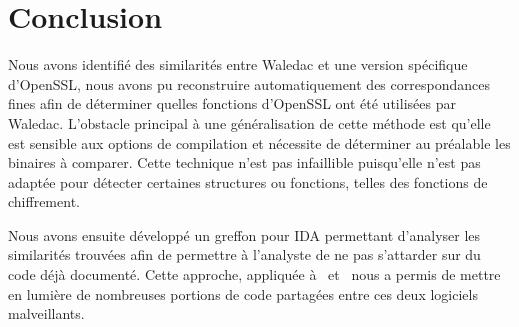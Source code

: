 \section{Conclusion}
Nous avons identifié des similarités entre Waledac et une version spécifique d'OpenSSL, nous avons pu reconstruire automatiquement des correspondances fines afin de déterminer quelles fonctions d'OpenSSL ont été utilisées par Waledac.
L'obstacle principal à une généralisation de cette méthode est qu'elle est sensible aux options de compilation et nécessite de déterminer au préalable les binaires à comparer.
Cette technique n'est pas infaillible puisqu'elle n'est pas adaptée pour détecter certaines structures ou fonctions, telles des fonctions de chiffrement.

Nous avons ensuite développé un greffon pour IDA permettant d'analyser les similarités trouvées afin de permettre à l'analyste de ne pas s'attarder sur du code déjà documenté.
Cette approche, appliquée à \duqu\ et \stux\ nous a permis de mettre en lumière de nombreuses portions de code partagées entre ces deux logiciels malveillants.
